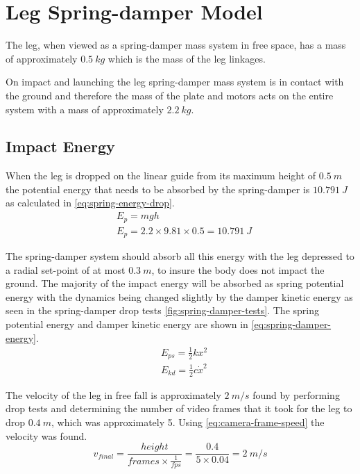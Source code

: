 \section{Leg Spring-damper Model}
\label{sec:Leg Spring-damper Model}
The leg, when viewed as a spring-damper mass system in free space, has a mass of approximately $0.5\ kg$ which is the mass of the leg linkages.

On impact and launching the leg spring-damper mass system is in contact with the ground and therefore the mass of the plate and motors acts on the entire system with a mass of approximately $2.2\ kg$.

\subsection{Impact Energy}
When the leg is dropped on the linear guide from its maximum height of $0.5\ m$ the potential energy that needs to be absorbed by the spring-damper is $10.791\ J$ as calculated in \cref{eq:spring-energy-drop}.
\begin{equation} \label{eq:spring-energy-drop}
\begin{aligned}
&E_p = mgh \\
&E_p = 2.2\times 9.81 \times 0.5 = 10.791\ J
\end{aligned}
\end{equation}

The spring-damper system should absorb all this energy with the leg depressed to a radial set-point of at most $0.3\ m$, to insure the body does not impact the ground. The majority of the impact energy will be absorbed as spring potential energy with the dynamics being changed slightly by the damper kinetic energy as seen in the spring-damper drop tests \cref{fig:spring-damper-tests}. The spring potential energy and damper kinetic energy are shown in \cref{eq:spring-damper-energy}.
\begin{equation} \label{eq:spring-damper-energy}
\begin{aligned}
&E_{ps} = \frac{1}{2}kx^2 \\
&E_{kd} = \frac{1}{2}c\dot{x}^2
\end{aligned}
\end{equation}

The velocity of the leg in free fall is approximately $2\ m/s$ found by performing drop tests and determining the number of video frames that it took for the leg to drop $0.4\ m$, which was approximately 5. Using \cref{eq:camera-frame-speed} the velocity was found.
\begin{equation} \label{eq:camera-frame-speed}
v_{final} = \frac{height}{frames \times \frac{1}{fps}} = \frac{0.4}{5 \times 0.04} = 2\ m/s
\end{equation}

